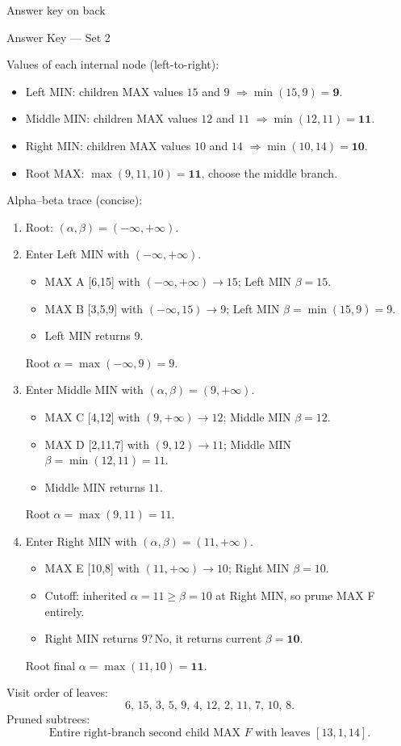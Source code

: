 \documentclass[10pt]{article}
\begin{document}
\vfill
\begin{center}
\small Answer key on back
\end{center}

\newpage
\begin{center}
\Large Answer Key — Set 2
\end{center}

\noindent Values of each internal node (left-to-right):
\begin{itemize}[leftmargin=14pt, itemsep=2pt, topsep=2pt]
  \item Left MIN: children MAX values $15$ and $9$ $\Rightarrow \min(15,9)=\mathbf{9}$.
  \item Middle MIN: children MAX values $12$ and $11$ $\Rightarrow \min(12,11)=\mathbf{11}$.
  \item Right MIN: children MAX values $10$ and $14$ $\Rightarrow \min(10,14)=\mathbf{10}$.
  \item Root MAX: $\max(9,11,10)=\mathbf{11}$, choose the middle branch.
\end{itemize}

\noindent Alpha–beta trace (concise):
\begin{enumerate}[leftmargin=14pt, itemsep=2pt]
  \item Root: $(\alpha,\beta)=(-\infty,+\infty)$.
  \item Enter Left MIN with $(-\infty,+\infty)$.
    \begin{itemize}[leftmargin=12pt]
      \item MAX A [6,15] with $(-\infty,+\infty)\rightarrow 15$; Left MIN $\beta=15$.
      \item MAX B [3,5,9] with $(-\infty,15)\rightarrow 9$; Left MIN $\beta=\min(15,9)=9$.
      \item Left MIN returns $9$.
    \end{itemize}
    Root $\alpha=\max(-\infty,9)=9$.
  \item Enter Middle MIN with $(\alpha,\beta)=(9,+\infty)$.
    \begin{itemize}[leftmargin=12pt]
      \item MAX C [4,12] with $(9,+\infty)\rightarrow 12$; Middle MIN $\beta=12$.
      \item MAX D [2,11,7] with $(9,12)\rightarrow 11$; Middle MIN $\beta=\min(12,11)=11$.
      \item Middle MIN returns $11$.
    \end{itemize}
    Root $\alpha=\max(9,11)=11$.
  \item Enter Right MIN with $(\alpha,\beta)=(11,+\infty)$.
    \begin{itemize}[leftmargin=12pt]
      \item MAX E [10,8] with $(11,+\infty)\rightarrow 10$; Right MIN $\beta=10$.
      \item Cutoff: inherited $\alpha=11 \ge \beta=10$ at Right MIN, so prune MAX F entirely.
      \item Right MIN returns $9? \,$No, it returns current $\beta=\mathbf{10}$.
    \end{itemize}
    Root final $\alpha=\max(11,10)=\mathbf{11}$.
\end{enumerate}

\noindent Visit order of leaves:
\[
6,\,15,\,3,\,5,\,9,\,4,\,12,\,2,\,11,\,7,\,10,\,8.
\]
Pruned subtrees:
\[
\text{Entire right-branch second child MAX }F\text{ with leaves }[13,1,14].
\]
\end{document}
